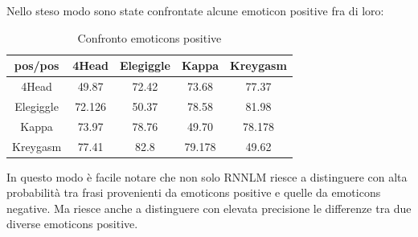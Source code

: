 \documentclass[a4paper,12pt,openright,twoside]{report}
\theoremstyle{definition}
\begin{document}
Nello steso modo sono state confrontate alcune emoticon positive fra di loro:
\begin{table}[H]
\begin{center}
\begin{tabular}{|c|c|c|c|c|}
\hline
pos/pos & 4Head & Elegiggle & Kappa & Kreygasm \\
\hline
\hline
4Head & 49.87 &  72.42 & 73.68 & 77.37 \\
\hline
Elegiggle & 72.126 & 50.37 & 78.58 & 81.98 \\
\hline
Kappa & 73.97 & 78.76 & 49.70 & 78.178 \\
\hline
Kreygasm & 77.41 & 82.8 & 79.178 & 49.62 \\
\hline
\end{tabular}
\end{center}
\caption{Confronto emoticons positive}
\label{tab:rnnlmTest2}
\end{table}

In questo modo è facile notare che non solo RNNLM riesce a distinguere con alta probabilità  tra frasi provenienti da emoticons positive e quelle da emoticons negative. 
Ma riesce anche a distinguere con elevata precisione le differenze tra due diverse emoticons positive.
\fi
\end{document}

